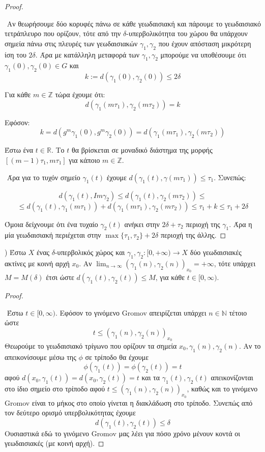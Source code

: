 \documentclass[oneside,a4paper]{article}
\newcommand {\tl}{\textlatin}
\newcommand{\Z}{\mathbb{Z}}
\begin{document}
\begin{proof} $ $

	$ $\newline
	Αν θεωρήσουμε δύο κορυφές πάνω σε κάθε γεωδαισιακή και πάρουμε το γεωδαισιακό τετράπλευρο που ορίζουν, τότε από την $\delta$-υπερβολικότητα του χώρου θα υπάρχουν σημεία πάνω στις πλευρές των γεωδαισιακών $\gamma_1,\gamma_2$ που έχουν απόσταση μικρότερη ίση του $2\delta$. Άρα με κατάλληλη μεταφορά των $\gamma_1,\gamma_2$ μπορούμε να υποθέσουμε ότι $\gamma_1(0),\gamma_2(0) \in G$ και $$k:= d(\gamma_1(0),\gamma_2(0)) \leq 2\delta$$


	
	\noindent Για κάθε $m \in \Z$ τώρα έχουμε ότι:
	$$d(\gamma_1(m\tau_1),\gamma_2(m\tau_2)) = k$$

	\noindent Εφόσον: $$k = d(g^m \gamma_1(0),g^m \gamma_2(0)) = d(\gamma_1(m\tau_1),\gamma_2 (m\tau_2))$$

	\noindent Έστω ένα $t \in \mathbb{R}$. Το $t$ θα βρίσκεται σε μοναδικό διάστημα της μορφής $[(m-1)\tau_1, m\tau_1]$ για κάποιο $m \in \Z$.

	$ $\newline
	\noindent Άρα για το τυχόν σημείο $\gamma_1(t)$ έχουμε $d(\gamma_1(t),\gamma(m\tau_1)) \leq \tau_1$. Συνεπώς:

	$$d(\gamma_1(t), Im\gamma_2)\leq d(\gamma_1(t),\gamma_2(m\tau_2)) \leq$$
	$$\leq d(\gamma_1(t), \gamma_1(m\tau_1)) + d(\gamma_1(m\tau_1), \gamma_2(m\tau_2)) \leq \tau_1 + k \leq \tau_1 + 2\delta$$

	\noindent Όμοια δείχνουμε ότι ένα τυχαίο $\gamma_2(t)$ ανήκει στην $2\delta + \tau_2$ περιοχή της $\gamma_1$. Άρα η μία γεωδαισιακή περιέχεται στην $\max \{\tau_1,\tau_2\} + 2\delta$ περιοχή της άλλης.

\end{proof}

\pagebreak

) Έστω $X$ ένας $\delta$-υπερβολικός χώρος και $\gamma_1,\gamma_2 : [0,+\infty) \rightarrow X$ δύο γεωδαισιακές ακτίνες με κοινή αρχή $x_0$. Αν $\lim_{n\rightarrow \infty} (\gamma_1(n),\gamma_2(n))_{x_0} = +\infty$, τότε υπάρχει $M=M(\delta)$ έτσι ώστε $d(\gamma_1(t),\gamma_2(t))\leq M$, για κάθε $t\in[0,\infty)$.


\begin{proof} $ $


	$ $\newline
	Έστω $t \in [0,\infty)$. Εφόσον το γινόμενο \tl{Gromov} απειρίζεται υπάρχει $n \in \mathbb{N}$ τέτοιο ώστε $$t \leq (\gamma_1(n),\gamma_2(n))_{x_0}$$ Θεωρούμε το γεωδαισιακό τρίγωνο που ορίζουν τα σημεία $x_0,\gamma_1(n),\gamma_2(n)$. Αν το απεικονίσουμε μέσω της $\phi$ σε τρίποδο θα έχουμε $$\phi(\gamma_1(t)) = \phi(\gamma_2(t)) = t$$ αφού $d(x_0,\gamma_1(t)) = d(x_0,\gamma_2(t)) = t$ και τα $\gamma_1(t),\gamma_2(t)$ απεικονίζονται στο ίδιο σημείο στο τρίποδο αφού $t \leq (\gamma_1(n),\gamma_2(n))_{x_0}$, καθώς και το γινόμενο \tl{Gromov} είναι το μήκος στο οποίο γίνεται η διακλάδωση στο τρίποδο. Συνεπώς από τον δεύτερο ορισμό υπερβολικότητας έχουμε $$d(\gamma_1(t),\gamma_2(t)) \leq \delta$$ Ουσιαστικά εδώ το γινόμενο \tl{Gromov} μας λέει για πόσο χρόνο μένουν κοντά οι γεωδαισιακές (με κοινή αρχή).
\end{proof}
\end{document}
